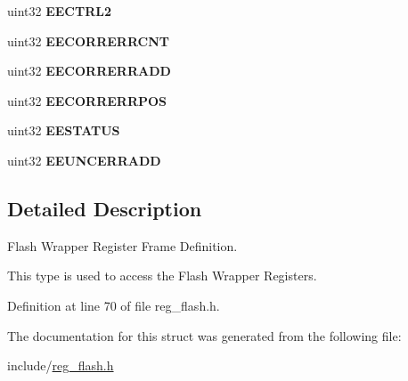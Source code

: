 \begin{DoxyCompactItemize}
uint32 {\bfseries E\+E\+C\+T\+R\+L2}
\item 
\mbox{\label{structflashWBase_a70009bff416188fadaad321da1339935}} 
uint32 {\bfseries E\+E\+C\+O\+R\+R\+E\+R\+R\+C\+NT}
\item 
\mbox{\label{structflashWBase_ad11a81fcb73ffa1fd0b761cb3e0cc221}} 
uint32 {\bfseries E\+E\+C\+O\+R\+R\+E\+R\+R\+A\+DD}
\item 
\mbox{\label{structflashWBase_a0495381245953a8dcf5cae449d402d72}} 
uint32 {\bfseries E\+E\+C\+O\+R\+R\+E\+R\+R\+P\+OS}
\item 
\mbox{\label{structflashWBase_a87c6ea37c0956441a5c1c0556fabcd29}} 
uint32 {\bfseries E\+E\+S\+T\+A\+T\+US}
\item 
\mbox{\label{structflashWBase_ad344c0d2d3f9745b51f202ec7d1a9464}} 
uint32 {\bfseries E\+E\+U\+N\+C\+E\+R\+R\+A\+DD}
\end{DoxyCompactItemize}


\subsection{Detailed Description}
Flash Wrapper Register Frame Definition. 

This type is used to access the Flash Wrapper Registers. 

Definition at line 70 of file reg\+\_\+flash.\+h.



The documentation for this struct was generated from the following file\+:\begin{DoxyCompactItemize}
\item 
include/\mbox{\hyperlink{reg__flash_8h}{reg\+\_\+flash.\+h}}\end{DoxyCompactItemize}
